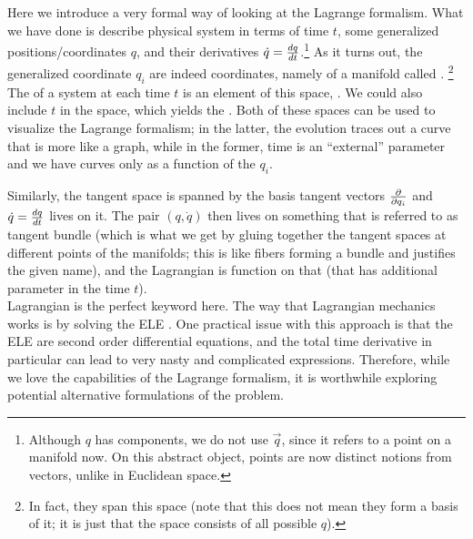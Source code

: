 \documentclass[../class_mech_main.tex]{subfiles}
\begin{document}
Here we introduce a very formal way of looking at the Lagrange formalism. What we have done is describe physical system in terms of time $t$, some generalized positions/coordinates $q$, and their derivatives $\dot{q} = \dv{q}{t}$.\footnote{Although $q$ has components, we do not use $\vec{q}$, since it refers to a point on a manifold now. On this abstract object, points are now distinct notions from vectors, unlike in Euclidean space.}
As it turns out, the generalized coordinate $q_i$ are indeed coordinates, namely of a manifold called .%
\footnote{In fact, they span this space (note that this does not mean they form a basis of it; it is just that the space consists of all possible $q$). }
The  of a system at each time $t$ is an element of this space, . We could also include $t$ in the space, which yields the . Both of these spaces can be used to visualize the Lagrange formalism; in the latter, the evolution traces out a curve that is more like a graph, while in the former, time is an \enquote{external} parameter and we have curves only as a function of the $q_i$.


Similarly, the tangent space is spanned by the basis tangent vectors $\pdv{q_i}$ and $\dot{q} = \dv{q}{t}$ lives on it. The pair $(q, \dot{q})$ then lives on something that is referred to as tangent bundle (which is what we get by gluing together the tangent spaces at different points of the manifolds; this is like fibers forming a bundle and justifies the given name), and the Lagrangian is function on that (that has additional parameter in the time $t$).\\


Lagrangian is the perfect keyword here. The way that Lagrangian mechanics works is by solving the ELE . One practical issue with this approach is that the ELE are second order differential equations, and the total time derivative in particular can lead to very nasty and complicated expressions. Therefore, while we love the capabilities of the Lagrange formalism, it is worthwhile exploring potential alternative formulations of the problem.
\end{document}
